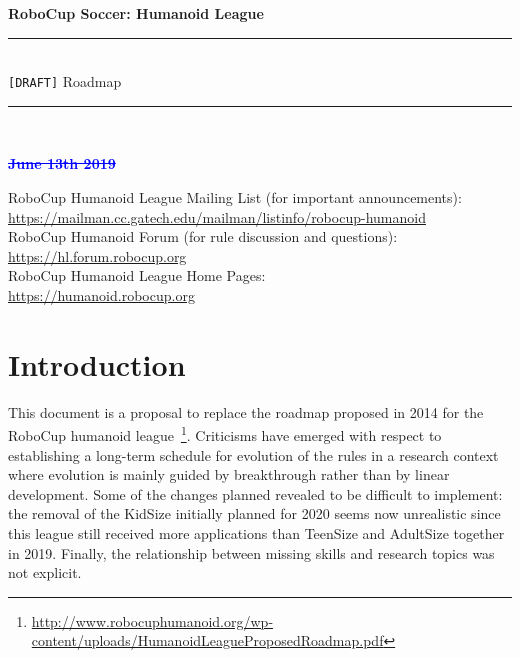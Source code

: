 \documentclass{article}
\newcommand{\removed}[1]{\textcolor{blue}{\sout{#1}}}
\newcommand{\added}[1]{{\color{magenta}{#1}}}
\begin{document}
\begin{center}
  {\Huge \bfseries
    RoboCup Soccer: Humanoid League
    \\
    \rule{\textwidth}{0.1cm}\\
    \vspace{0.5cm}
    \verb![DRAFT]! Roadmap \added{from 2020 to 2050}\\
    \vspace{0.5cm}
    \rule{\textwidth}{0.1cm}\\
  }
  {\bfseries \added{January 18th 2020} \removed{June 13th 2019}}
\end{center}

RoboCup Humanoid League Mailing List (for important announcements):\\
\url{https://mailman.cc.gatech.edu/mailman/listinfo/robocup-humanoid}
\\
RoboCup Humanoid Forum (for rule discussion and questions):\\
\url{https://hl.forum.robocup.org}
\\
RoboCup Humanoid League Home Pages:\\
\url{https://humanoid.robocup.org}\\

\clearpage


\section{Introduction}

This document is a proposal to replace the roadmap proposed in 2014 for the
RoboCup humanoid
league~\footnote{\url{http://www.robocuphumanoid.org/wp-content/uploads/HumanoidLeagueProposedRoadmap.pdf}}. Criticisms
have emerged with respect to establishing a long-term schedule for evolution of
the rules in a research context where evolution is mainly guided by breakthrough
rather than by linear development. Some of the changes planned revealed to be
difficult to implement: the removal of the KidSize initially planned for 2020
seems now unrealistic since this league still received more applications than
TeenSize and AdultSize together in 2019. Finally, the relationship between
missing skills and research topics was not explicit.
\end{document}
